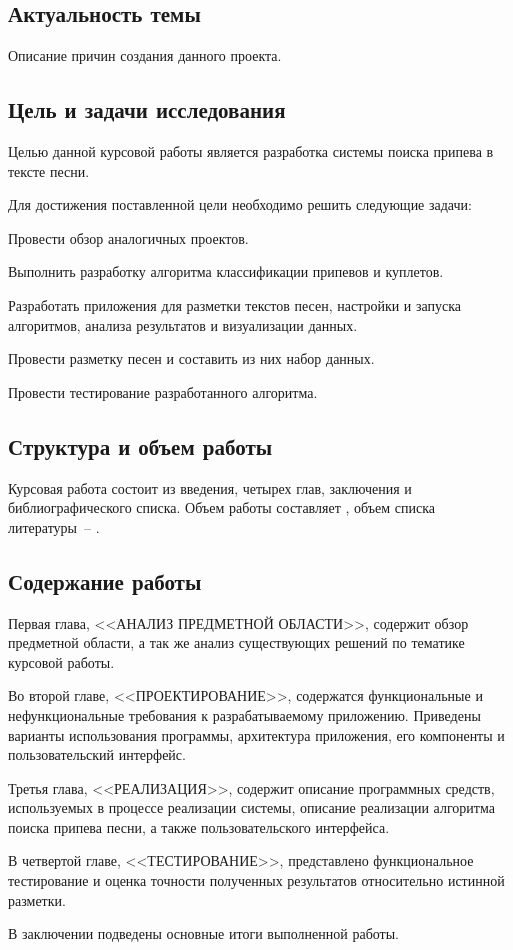 \newpage
{}
\subsection*{Актуальность темы}
Описание причин создания данного проекта.
\subsection*{Цель и задачи исследования}
Целью данной курсовой работы является разработка системы поиска припева в тексте песни.

Для достижения поставленной цели необходимо решить следующие задачи:
\begin{enumerateparen}
    \item Провести обзор аналогичных проектов.   
    \item Выполнить разработку алгоритма классификации припевов и куплетов.
    \item Разработать приложения для разметки текстов песен, настройки и запуска алгоритмов, анализа результатов и визуализации данных.
    \item Провести разметку песен и составить из них набор данных.
    \item Провести тестирование разработанного алгоритма.
\end{enumerateparen}
\subsection*{Структура и объем работы}
Курсовая работа состоит из введения, четырех глав, заключения и библиографического списка. Объем работы составляет , объем списка литературы~-- .
\subsection*{Содержание работы}
Первая глава, <<АНАЛИЗ ПРЕДМЕТНОЙ ОБЛАСТИ>>, содержит обзор предметной области, а так же анализ существующих решений по тематике курсовой работы.

Во второй главе, <<ПРОЕКТИРОВАНИЕ>>, содержатся функциональные и нефункциональные 
требования к разрабатываемому приложению. Приведены варианты использования программы, архитектура приложения, его компоненты и пользовательский интерфейс.

Третья глава, <<РЕАЛИЗАЦИЯ>>, содержит описание программных средств, используемых в процессе реализации системы, описание реализации алгоритма поиска припева песни, а также пользовательского интерфейса.

В четвертой главе, <<ТЕСТИРОВАНИЕ>>, представлено функциональное тестирование и оценка точности полученных результатов относительно истинной разметки.

В заключении подведены основные итоги выполненной работы.